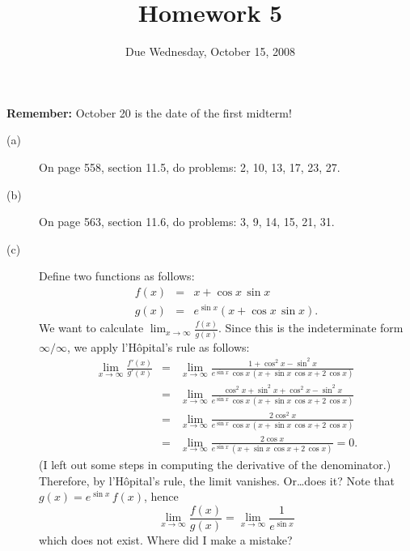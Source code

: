 \documentclass[12pt]{article}
\title{Homework 5}
\date{Due Wednesday, October 15, 2008}
\begin{document}
\maketitle

\textbf{Remember:} October 20 is the date of the first midterm!

\begin{description}

\item[(a)] On page 558, section 11.5, do problems: 2, 10, 13, 17, 23, 27.

\vfill

\item[(b)] On page 563, section 11.6, do problems: 3, 9, 14, 15, 21, 31.

\vfill

\item[(c)] Define two functions as follows:
\begin{eqnarray*}
f(x) &=& x + \cos x \, \sin x \\
g(x) &=& e^{\sin x} \left( x + \cos x \, \sin x \right).
\end{eqnarray*}
We want to calculate $\displaystyle\lim_{x \to \infty} \displaystyle\frac{f(x)}{g(x)}$.  Since this is the indeterminate form $\infty/\infty$, we apply l'H\^opital's rule as follows:
\begin{eqnarray*}
\lim_{x \to \infty} \frac{f'(x)}{g'(x)}
&=& \lim_{x \to \infty} \frac{1 + \cos^2 x - \sin^2 x}{e^{\sin x} \, \cos x \, \left( x + \sin x \, \cos x + 2 \, \cos x \right)} \\
&=& \lim_{x \to \infty} \frac{\cos^2 x + \sin^2 x + \cos^2 x - \sin^2 x}{e^{\sin x} \, \cos x \, \left( x + \sin x \, \cos x + 2 \, \cos x \right)} \\
&=& \lim_{x \to \infty} \frac{2 \cos^2 x}{e^{\sin x} \, \cos x \, \left( x + \sin x \, \cos x + 2 \, \cos x \right)} \\
&=& \lim_{x \to \infty} \frac{2 \cos x}{e^{\sin x} \, \left( x + \sin x \, \cos x + 2 \, \cos x \right)} = 0.
\end{eqnarray*}
(I left out some steps in computing the derivative of the
denominator.)  Therefore, by l'H\^opital's rule, the limit vanishes.
Or\ldots does it?  Note that $g(x) = e^{\sin x} \, f(x)$, hence
$$
\lim_{x \to \infty} \frac{f(x)}{g(x)} = \lim_{x \to \infty} \frac{1}{e^{\sin x}}
$$
which does not exist.  Where did I make a mistake?

\end{description}
\end{document}
